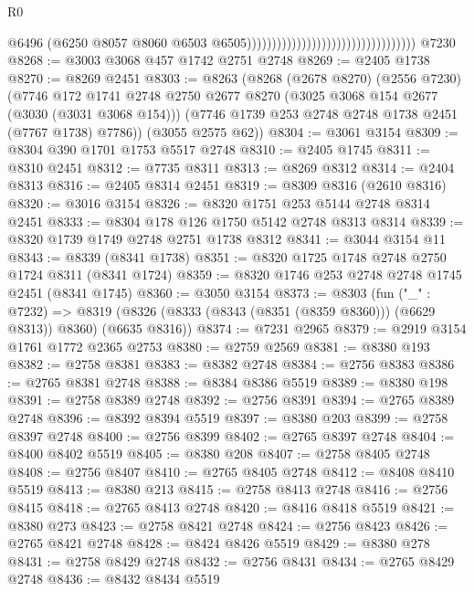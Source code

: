 \begin{lexlean}{R0}
\begin{coremodule}
                                                                      @6496
                                                                      (@6250
                                                                        @8057
                                                                        @8060
                                                                        @6503
                                                                        @6505))))))))))))))))))))))))))))))))))
    @7230
@8268 := @3003 @3068 @457 @1742 @2751 @2748
@8269 := @2405 @1738
@8270 := @8269 @2451
@8303 := @8263
    (@8268
      (@2678 @8270)
      (@2556 @7230)
      (@7746
        @172
        @1741
        @2748
        @2750
        @2677
        @8270
        (@3025 @3068 @154 @2677 (@3030 (@3031 @3068 @154)))
        (@7746 @1739 @253 @2748 @2748 @1738 @2451 (@7767 @1738) @7786))
      (@3055 @2575 @62))
@8304 := @3061 @3154
@8309 := @8304 @390 @1701 @1753 @5517 @2748
@8310 := @2405 @1745
@8311 := @8310 @2451
@8312 := @7735 @8311
@8313 := @8269 @8312
@8314 := @2404 @8313
@8316 := @2405 @8314 @2451
@8319 := @8309 @8316 (@2610 @8316)
@8320 := @3016 @3154
@8326 := @8320 @1751 @253 @5144 @2748 @8314 @2451
@8333 := @8304 @178 @126 @1750 @5142 @2748 @8313 @8314
@8339 := @8320 @1739 @1749 @2748 @2751 @1738 @8312
@8341 := @3044 @3154 @11
@8343 := @8339 (@8341 @1738)
@8351 := @8320 @1725 @1748 @2748 @2750 @1724 @8311 (@8341 @1724)
@8359 := @8320 @1746 @253 @2748 @2748 @1745 @2451 (@8341 @1745)
@8360 := @3050 @3154
@8373 := @8303
    (fun ("_" : @7232) =>
    @8319 (@8326 (@8333 (@8343 (@8351 (@8359 @8360))) (@6629 @8313)) @8360) (@6635 @8316))
@8374 := @7231 @2965
@8379 := @2919 @3154 @1761 @1772 @2365 @2753
@8380 := @2759 @2569
@8381 := @8380 @193
@8382 := @2758 @8381
@8383 := @8382 @2748
@8384 := @2756 @8383
@8386 := @2765 @8381 @2748
@8388 := @8384 @8386 @5519
@8389 := @8380 @198
@8391 := @2758 @8389 @2748
@8392 := @2756 @8391
@8394 := @2765 @8389 @2748
@8396 := @8392 @8394 @5519
@8397 := @8380 @203
@8399 := @2758 @8397 @2748
@8400 := @2756 @8399
@8402 := @2765 @8397 @2748
@8404 := @8400 @8402 @5519
@8405 := @8380 @208
@8407 := @2758 @8405 @2748
@8408 := @2756 @8407
@8410 := @2765 @8405 @2748
@8412 := @8408 @8410 @5519
@8413 := @8380 @213
@8415 := @2758 @8413 @2748
@8416 := @2756 @8415
@8418 := @2765 @8413 @2748
@8420 := @8416 @8418 @5519
@8421 := @8380 @273
@8423 := @2758 @8421 @2748
@8424 := @2756 @8423
@8426 := @2765 @8421 @2748
@8428 := @8424 @8426 @5519
@8429 := @8380 @278
@8431 := @2758 @8429 @2748
@8432 := @2756 @8431
@8434 := @2765 @8429 @2748
@8436 := @8432 @8434 @5519

\end{coremodule}
\end{lexlean}
